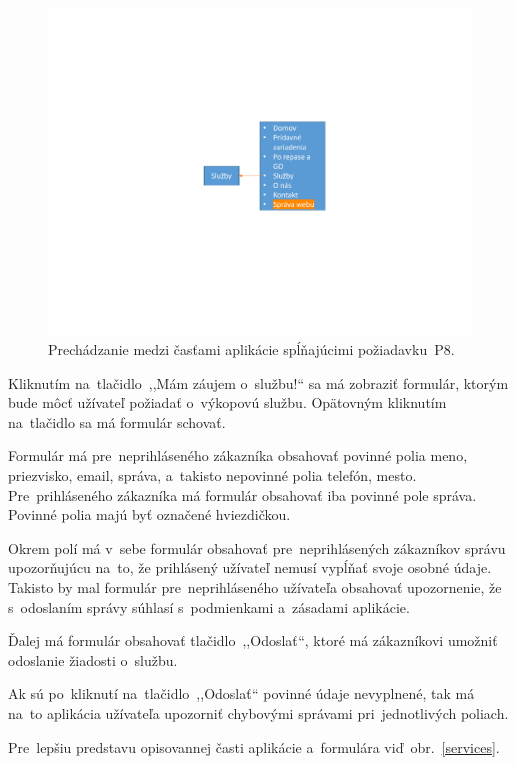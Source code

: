 \begin{figure}[H]\centering
\includegraphics[width=140mm]{../img/UI concept/p8 graph}
\caption{Prechádzanie medzi časťami aplikácie spĺňajúcimi požiadavku~P8.}
\label{p8 graph}
\end{figure}

Kliknutím na~tlačidlo~,,Mám záujem o~službu!`` sa má zobraziť formulár, ktorým bude môcť užívateľ požiadať o~výkopovú službu. Opätovným kliknutím na~tlačidlo sa má formulár schovať.

Formulár má pre~neprihláseného zákazníka obsahovať povinné polia meno, priezvisko, email, správa, a~takisto nepovinné polia telefón, mesto. Pre~prihláseného zákazníka má formulár obsahovať iba povinné pole správa. Povinné polia majú byť označené hviezdičkou.

Okrem polí má v~sebe formulár obsahovať pre~neprihlásených zákazníkov správu upozorňujúcu na~to, že prihlásený užívateľ nemusí vypĺňať svoje osobné údaje. Takisto by mal formulár pre~neprihláseného užívateľa obsahovať upozornenie, že s~odoslaním správy súhlasí s~podmienkami a~zásadami aplikácie.

Ďalej má formulár obsahovať tlačidlo~,,Odoslať``, ktoré má zákazníkovi umožniť odoslanie žiadosti o~službu.

Ak sú po~kliknutí na~tlačidlo~,,Odoslať`` povinné údaje nevyplnené, tak má na~to aplikácia užívateľa upozorniť chybovými správami pri~jednotlivých poliach.

Pre~lepšiu predstavu opisovannej časti aplikácie a~formulára viď~obr.~\ref{services}.

